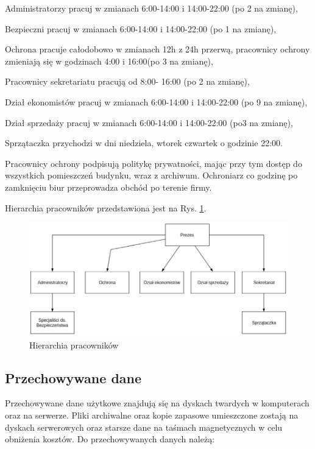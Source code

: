 \begin{minipage}[\right]{15cm}
	\begin{itemize*}
		\item Administratorzy pracuj w zmianach 6:00-14:00 i 14:00-22:00 (po 2 na zmianę),
		\item Bezpieczni pracuj w zmianach 6:00-14:00 i 14:00-22:00 (po 1 na zmianę),
		\item Ochrona pracuje całodobowo w zmianach 12h z 24h przerwą, pracownicy ochrony zmieniają się w godzinach 4:00 i 16:00(po 3 na zmianę),
		\item Pracownicy sekretariatu pracują od 8:00- 16:00 (po 2 na zmianę),
		\item Dział ekonomistów pracuj w zmianach 6:00-14:00 i 14:00-22:00 (po 9 na zmianę),
		\item Dział sprzedaży pracuj w zmianach 6:00-14:00 i 14:00-22:00 (po3 na zmianę),
		\item Sprzątaczka przychodzi w dni niedziela, wtorek czwartek o godzinie 22:00.
	\end{itemize*}
\end{minipage}

Pracownicy ochrony podpisują politykę prywatności, mając przy tym dostęp do wszystkich pomieszczeń budynku, wraz z archiwum. Ochroniarz co godzinę po zamknięciu biur przeprowadza obchód po terenie firmy.

Hierarchia pracowników przedstawiona jest na Rys. \ref{schemat:hierarchia_pracownikow}.
\begin{figure}[!h]
	\includegraphics[width=15cm]{Hierarchia_pracownikow.png}
	\caption{Hierarchia pracowników}
	\label{schemat:hierarchia_pracownikow}
\end{figure}

\newpage
\subsection{Przechowywane dane}
Przechowywane dane użytkowe znajdują się na dyskach twardych \linebreak w komputerach oraz na serwerze. Pliki archiwalne oraz kopie zapasowe umieszczone zostają na dyskach serwerowych oraz starsze dane na taśmach magnetycznych w celu obniżenia kosztów. Do przechowywanych danych \linebreak należą:

